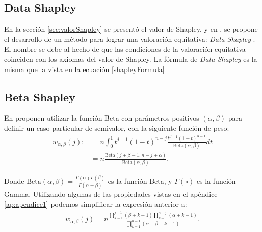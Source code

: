 \subsection*{Data Shapley}
En la sección \ref{sec:valorShapley} se presentó
el valor de Shapley, y en \cite{shapleyValue}, se propone
el desarrollo de un método para lograr una valoración equitativa:
\textit{Data Shapley} . El nombre se debe al
hecho de que las condiciones de la valoración equitativa coinciden
con los axiomas del valor de Shapley. La fórmula de \textit{Data Shapley} es
la misma que la vista en la ecuación \ref{shapleyFormula}





\subsection*{Beta Shapley}
En \cite{betaShapley} proponen  utilizar la función Beta con
parámetros positivos $(\alpha,\beta)$ para definir
un caso particular de semivalor, con la siguiente función de peso:
\begin{equation*}
  \begin{split}
    w_{\alpha, \beta}(j) :&= n \int_{0}^{1} t^{j-1}(1-t)^{n-j}
    \frac{t^{\beta-1}(1-t)^{\alpha-1}}{\text{Beta}(\alpha,\beta)}dt\\
    &= n\frac{\text{Beta}(j+\beta-1, n-j+\alpha)}
  {\text{Beta}(\alpha,\beta)}.
  \end{split}
\end{equation*}
 
Donde $\text{Beta}(\alpha,\beta) = \frac{\Gamma(\alpha)\Gamma(\beta)}
{\Gamma(\alpha+\beta)}$ es la función Beta, y $\Gamma(\circ)$ es
la función Gamma. Utilizando algunas de las propiedades vistas
en el apéndice \ref{ap:apendice1} podemos simplificar la expresión
anterior a:  \index{$\Gamma$} 
\begin{equation*}
  \begin{split}
  \label{eq:pesoBeta}
  w_{\alpha, \beta}(j) = n\frac{\prod_{k=1}^{j-1}(\beta+k-1)
  \prod_{k=1}^{n-j}(\alpha+k-1)}
  {\prod_{k=1}^{n-1}(\alpha+\beta+k-1)}.
  \end{split}
\end{equation*}

